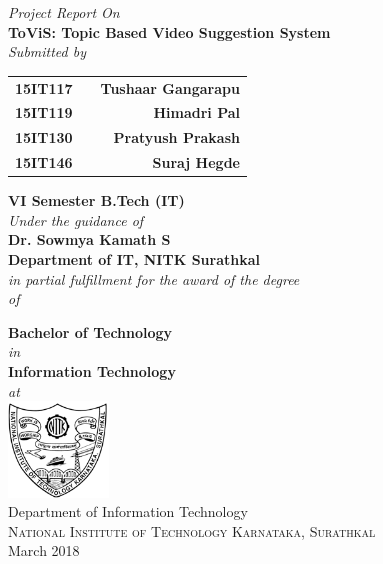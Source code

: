 \begin{titlepage}

\begin{center}
\vspace{2mm}
\textup{\small \textit{Project Report On}}\\

\Large \textbf {ToViS: Topic Based Video Suggestion System}\\[0.5in]

\normalsize \textit{Submitted by} \\
\begin{table}[h]
\centering
\bgroup
\def\arraystretch{1.4}
\begin{tabular}{lcr}
\textbf{15IT117} & & \textbf{Tushaar Gangarapu} \\
\textbf{15IT119} & & \textbf{Himadri Pal} \\ 
\textbf{15IT130} & & \textbf{Pratyush Prakash} \\
\textbf{15IT146} & & \textbf{Suraj Hegde} \\
\end{tabular}
\egroup
\end{table}

\textbf{VI Semester B.Tech (IT)}\\[0.4in]

\textit{Under the guidance of}\\\vspace{3mm}
{\textbf{Dr. Sowmya Kamath S}}\\
{\textbf{Department of IT, NITK Surathkal}}\\[0.4in]

       \small \emph{in partial fulfillment for the award of the degree\\\vspace{2mm} of}
        \vspace{.3in}

       {\bf Bachelor of Technology} \\\vspace{2mm} \textit{in} \\\vspace{2mm} {\bf Information Technology} \\\vspace{2mm} \textit{at}\\[0.3in]

\includegraphics[width=0.2\textwidth]{images/logo}\\
\Large{Department of Information Technology}\\
\normalsize
\textsc{National Institute of Technology Karnataka, Surathkal}\\
March 2018 \\
\vspace{0.3cm}

\end{center}

\end{titlepage}
